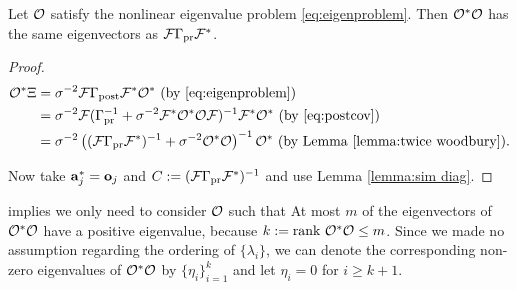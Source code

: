 \documentclass{amsart}
\numberwithin{equation}{section}
\begin{document}
\begin{corollary}\label{cor:same ev}
  Let $\mathcal{O}$ satisfy the nonlinear eigenvalue problem
  \eqref{eq:eigenproblem}. Then $\mathcal{O}^*\mathcal{O}$ has the same eigenvectors
  as $\mathcal{F} \Gamma_{\textup{pr}} \mathcal{F}^*$.
\end{corollary}
\begin{proof}
  \begin{align}\label{eq:mod conditions}
    \begin{split}
      \mathcal{O}^* \Xi &= \sigma^{-2}\mathcal{F} \Gamma_{\textup{post}} \mathcal{F}^* \mathcal{O}^*  \text{ (by \eqref{eq:eigenproblem})}\\
      &= \sigma^{-2} \mathcal{F}( \Gamma_{\textup{pr}}^{-1} + \sigma^{-2}  \mathcal{F}^* \mathcal{O}^* \mathcal{O} \mathcal{F} )^{-1} \mathcal{F}^* \mathcal{O}^*  \text{ (by \eqref{eq:postcov})} \\
      &= \sigma^{-2} \left ( (\mathcal{F}\Gamma_{\textup{pr}}\mathcal{F}^*)^{-1} + \sigma^{-2}  \mathcal{O}^* \mathcal{O} \right )^{-1} \mathcal{O}^* \text{ (by Lemma \ref{lemma:twice woodbury})}.
    \end{split}
  \end{align}

  Now take $\mathbf{a}_j^{*} = \mathbf{o}_j$ and $C := (\mathcal{F} \Gamma_{\textup{pr}}
  \mathcal{F}^*)^{-1}$ and use Lemma \ref{lemma:sim diag}.
\end{proof}


implies we only need to consider $\mathcal{O}$ such that  
At most $m$ of the eigenvectors of $\mathcal{O}^*\mathcal{O}$ have a positive
eigenvalue, because $k := \textup{rank}\  \mathcal{O}^*\mathcal{O} \leq m$. Since we made no
assumption regarding the ordering of $\{\lambda_i\}$, we can denote
the corresponding non-zero eigenvalues of $\mathcal{O}^*\mathcal{O}$ by
$\{\eta_i\}_{i=1}^{k}$ and let $\eta_i = 0$ for $i \geq k+1$.
\end{document}
